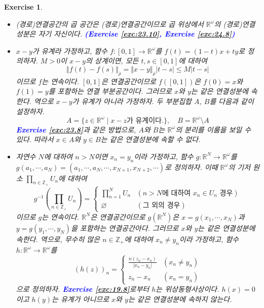 \documentclass{article}
\newtheorem{exercise}{Exercise}[section]
\newcommand{\R}{\mathbb{R}}
\newcommand{\Z}{\mathbb{Z}}
\begin{document}
\begin{exercise}
    \phantom{}
    \begin{itemize}
        \item[(a)] (경로)연결공간의 곱 공간은 (경로)연결공간이므로 곱 위상에서 $\R^\omega$의 (경로)연결성분은 자기 자신이다. \textcolor{blue}{\textbf{(Exercise \ref{exc:23.10}, Exercise \ref{exc:24.8})}}
        \item[(b)] $x-y$가 유계라 가정하고, 함수 $f:[0,1]\to\R^\omega$를 $f(t)=(1-t)x+ty$로 정의하자. $M>0$이 $x-y$의 상계이면, 모든 $t,s\in[0,1]$에 대하여
            \[
                \Vert f(t)-f(s)\Vert_{\overline{\rho}}=\Vert x-y\Vert_{\overline{\rho}}\vert t-s\vert\leq M\vert t-s\vert
            \]
            이므로 $f$는 연속이다. $[0,1]$은 연결공간이므로 $f([0,1])$은 $f(0)=x$와 $f(1)=y$를 포함하는 연결 부분공간이다. 그러므로 $x$와 $y$는 같은 연결성분에 속한다. 역으로 $x-y$가 유계가 아니라 가정하자. 두 부분집합 $A$, $B$를 다음과 같이 설정하자.
            \[
                A=\{z\in\R^\omega\mid x-z\text{가 유계이다.}\},\quad B=\R^\omega\setminus A
            \]
            \textcolor{blue}{\textbf{Exercise \ref{exc:23.8}}}과 같은 방법으로, $A$와 $B$는 $\R^\omega$의 분리를 이룸을 보일 수 있다. 따라서 $x\in A$와 $y\in B$는 같은 연결성분에 속할 수 없다.
        \item[(c)] 자연수 $N$에 대하여 $n>N$이면 $x_n=y_n$이라 가정하고, 함수 $g:\R^N\to\R^\omega$를 $g(a_1,\cdots,a_N)=(a_1,\cdots,a_N,\cdots,x_{N+1},x_{N+2},\cdots)$로 정의하자. 이때 $\R^\omega$의 기저 원소 $\prod_{n\in\Z_+}U_n$에 대하여
            \[
                g^{-1}\left(\prod_{n\in\Z_+}U_n\right)=\begin{cases}
                    \displaystyle\prod_{n=1}^NU_n & (n>N\text{에 대하여 }x_n\in U_n\text{ 경우})\\[6pt]
                    \varnothing & (\text{그 외의 경우})
                \end{cases}
            \]
            이므로 $g$는 연속이다. $\R^N$은 연결공간이므로 $g(\R^N)$은 $x=g(x_1,\cdots,x_N)$과 $y=g(y_1,\cdots,y_N)$을 포함하는 연결공간아다. 그러므로 $x$와 $y$는 같은 연결성분에 속한다. 역으로, 무수히 많은 $n\in\Z_+$에 대하여 $x_n\ne y_n$이라 가정하고, 함수 $h:\R^\omega\to\R^\omega$를
            \[
                (h(z))_n=\begin{cases}
                    \displaystyle\frac{n(z_n-x_n)}{\vert x_n-y_n\vert} & (x_n\ne y_n)\\[3pt]
                    z_n-x_n & (x_n=y_n)
                \end{cases}
            \]
            으로 정의하자. \textcolor{blue}{\textbf{Exercise \ref{exc:19.8}}}로부터 $h$는 위상동형사상이다. $h(x)=0$이고 $h(y)$는 유계가 아니므로 $x$와 $y$는 같은 연결성분에 속하지 않는다.
    \end{itemize}
\end{exercise}
\end{document}
